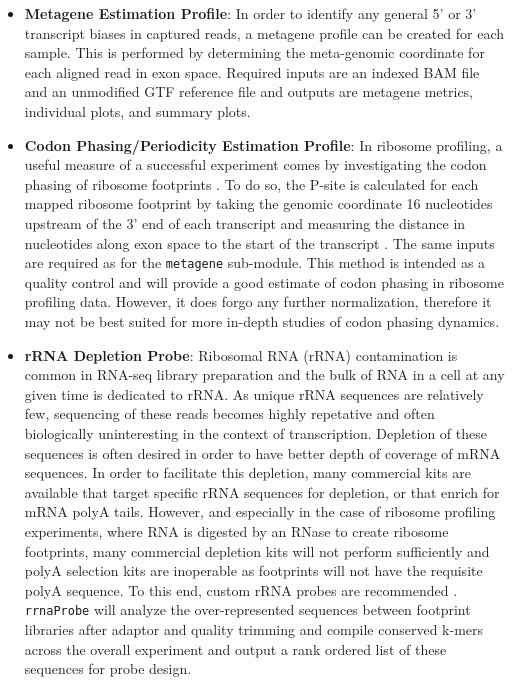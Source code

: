 \documentclass[11pt, a4paper, oneside]{article}
\begin{document}
\begin{enumerate}
\begin{itemize}
      \item \textbf{Metagene Estimation Profile}: In order to identify any general 5' or 3' transcript biases in captured reads, a metagene profile can be created for each sample. This is performed by determining the meta-genomic coordinate for each aligned read in exon space. Required inputs are an indexed BAM file and an unmodified GTF reference file and outputs are metagene metrics, individual plots, and summary plots.

      \item \textbf{Codon Phasing/Periodicity Estimation Profile}: In ribosome profiling, a useful measure of a successful experiment comes by investigating the codon phasing of ribosome footprints \cite{ingolia_meth}. To do so, the P-site is calculated for each mapped ribosome footprint by taking the genomic coordinate 16 nucleotides upstream of the 3' end of each transcript and measuring the distance in nucleotides along exon space to the start of the transcript \cite{ribowaltz}. The same inputs are required as for the \texttt{metagene} sub-module. This method is intended as a quality control and will provide a good estimate of codon phasing in ribosome profiling data. However, it does forgo any further normalization, therefore it may not be best suited for more in-depth studies of codon phasing dynamics.

      \item \textbf{rRNA Depletion Probe}: Ribosomal RNA (rRNA) contamination is common in RNA-seq library preparation and the bulk of RNA in a cell at any given time is dedicated to rRNA. As unique rRNA sequences are relatively few, sequencing of these reads becomes highly repetative and often biologically uninteresting in the context of transcription. Depletion of these sequences is often desired in order to have better depth of coverage of mRNA sequences. In order to facilitate this depletion, many commercial kits are available that target specific rRNA sequences for depletion, or that enrich for mRNA polyA tails. However, and especially in the case of ribosome profiling experiments, where RNA is digested by an RNase to create ribosome footprints, many commercial depletion kits will not perform sufficiently and polyA selection kits are inoperable as footprints will not have the requisite polyA sequence. To this end, custom rRNA probes are recommended \cite{ingolia_meth, ingolia_science}. \texttt{rrnaProbe} will analyze the over-represented sequences between footprint libraries after adaptor and quality trimming and compile conserved k-mers across the overall experiment and output a rank ordered list of these sequences for probe design.

    \end{itemize}
\end{enumerate}
\end{document}
